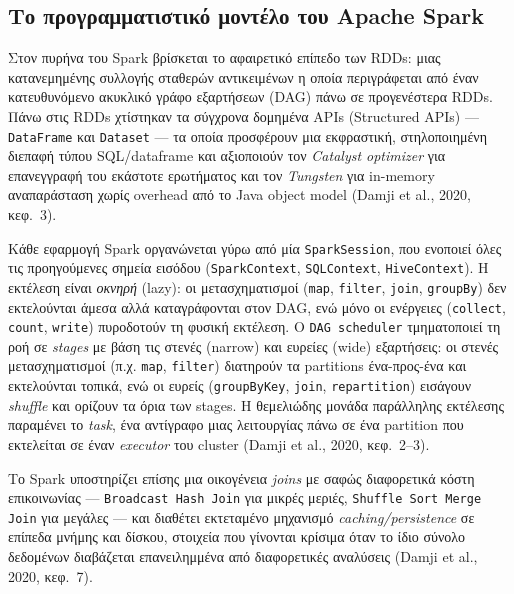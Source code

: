 \documentclass[12pt]{article}
\begin{document}
\subsection{Το προγραμματιστικό μοντέλο του Apache Spark}
Στον πυρήνα του Spark βρίσκεται το αφαιρετικό επίπεδο των RDDs: μιας κατανεμημένης συλλογής σταθερών αντικειμένων η οποία περιγράφεται από έναν κατευθυνόμενο ακυκλικό γράφο εξαρτήσεων (DAG) πάνω σε προγενέστερα RDDs. Πάνω στις RDDs χτίστηκαν τα σύγχρονα δομημένα APIs (Structured APIs) — \texttt{DataFrame} και \texttt{Dataset} — τα οποία προσφέρουν μια εκφραστική, στηλοποιημένη διεπαφή τύπου SQL/dataframe και αξιοποιούν τον \emph{Catalyst optimizer} για επανεγγραφή του εκάστοτε ερωτήματος και τον \emph{Tungsten} για in-memory αναπαράσταση χωρίς overhead από το Java object model (Damji et al., 2020, κεφ.~3).

Κάθε εφαρμογή Spark οργανώνεται γύρω από μία \texttt{SparkSession}, που ενοποιεί όλες τις προηγούμενες σημεία εισόδου (\texttt{SparkContext}, \texttt{SQLContext}, \texttt{HiveContext}). Η εκτέλεση είναι \emph{οκνηρή} (lazy): οι μετασχηματισμοί (\texttt{map}, \texttt{filter}, \texttt{join}, \texttt{groupBy}) δεν εκτελούνται άμεσα αλλά καταγράφονται στον DAG, ενώ μόνο οι ενέργειες (\texttt{collect}, \texttt{count}, \texttt{write}) πυροδοτούν τη φυσική εκτέλεση. Ο \texttt{DAG scheduler} τμηματοποιεί τη ροή σε \emph{stages} με βάση τις στενές (narrow) και ευρείες (wide) εξαρτήσεις: οι στενές μετασχηματισμοί (π.χ. \texttt{map}, \texttt{filter}) διατηρούν τα partitions ένα-προς-ένα και εκτελούνται τοπικά, ενώ οι ευρείς (\texttt{groupByKey}, \texttt{join}, \texttt{repartition}) εισάγουν \emph{shuffle} και ορίζουν τα όρια των stages. Η θεμελιώδης μονάδα παράλληλης εκτέλεσης παραμένει το \emph{task}, ένα αντίγραφο μιας λειτουργίας πάνω σε ένα partition που εκτελείται σε έναν \emph{executor} του cluster (Damji et al., 2020, κεφ.~2--3).

Το Spark υποστηρίζει επίσης μια οικογένεια \emph{joins} με σαφώς διαφορετικά κόστη επικοινωνίας — \texttt{Broadcast Hash Join} για μικρές μεριές, \texttt{Shuffle Sort Merge Join} για μεγάλες — και διαθέτει εκτεταμένο μηχανισμό \emph{caching/persistence} σε επίπεδα μνήμης και δίσκου, στοιχεία που γίνονται κρίσιμα όταν το ίδιο σύνολο δεδομένων διαβάζεται επανειλημμένα από διαφορετικές αναλύσεις (Damji et al., 2020, κεφ.~7).
\end{document}

